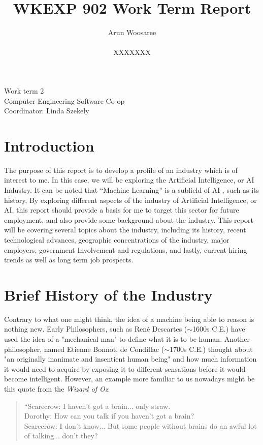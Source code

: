 \documentclass[letterpaper,12pt]{article}
\title{WKEXP 902 Work Term Report}
\author{Arun Woosaree \\ \\ XXXXXXX}
\begin{document}
\relax
\begin{titlepage}
 \maketitle
 \thispagestyle{empty} %
 \centering
 \large
 \vspace{1cm}
 Work term 2\\
 \vspace{1cm}
 Computer Engineering Software Co-op \\
 \vspace{1cm}
 Coordinator: Linda Szekely
\end{titlepage}

\section{Introduction}
The purpose of this report is to develop a profile of an industry which is of interest to me.
In this case, we will be exploring the Artificial Intelligence, or AI Industry.
It can be noted that ``Machine Learning'' is a subfield of AI \cite{sasAIvsML} , such as its history, 
By exploring different aspects of the industry of Artificial Intelligence, or AI, this report should
provide a basis for me to target this sector for future employment, and
also provide some background about the industry.
This report will be covering several topics about the industry,
including its history, recent technological advances, geographic
concentrations of the industry, major employers, government Involvement
and regulations, and lastly, current hiring trends as well as
long term job prospects.


\section{Brief History of the Industry}
Contrary to what one might think, the idea of a machine being able to reason is nothing new. 
Early Philosophers, such as René Descartes ($\sim$1600s C.E.) have used the idea of a "mechanical man"
to define what it is to be human.\cite{briefhistory}\cite{sep-descartes}
Another philosopher, named Etienne Bonnot, de Condillac\cite{briefhistory} ($\sim$1700s C.E.)
thought about "an originally inanimate and insentient human being"\cite{sep-condillac}
and how much information it would need to acquire by exposing it to different sensations
before it would become intelligent. However, an example more familiar to us nowadays
might be this quote from the \textit{Wizard of Oz}\cite{wizardofoz}:
\begin{quotation}
    \noindent“Scarecrow: I haven't got a brain... only straw.\\
    Dorothy: How can you talk if you haven't got a brain?\\
    Scarecrow: I don't know... But some people without brains do an awful lot of talking... don't they?\\
\end{quotation}
\end{document}

